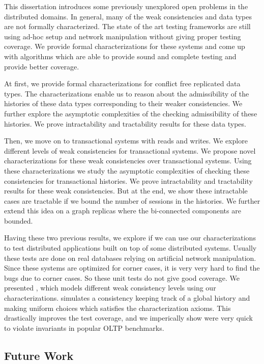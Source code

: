 
This dissertation introduces some previously unexplored open problems in the distributed domains. In general, many of the weak consistencies and data types are not formally characterized. The state of the art testing frameworks are still using ad-hoc setup and network manipulation without giving proper testing coverage. We provide formal characterizations for these systems and come up with algorithms which are able to provide sound and complete testing and provide better coverage.

At first, we provide formal characterizations for conflict free replicated data types. The characterizations enable us to reason about the admissibility of the histories of these data types corresponding to their weaker consistencies. We further explore the asymptotic complexities of the checking admissibility of these histories. We prove intractability and tractability results for these data types.

Then, we move on to transactional systems with reads and writes. We explore different levels of weak consistencies for transactional systems. We propose novel characterizations for these weak consistencies over transactional systems. Using these characterizations we study the asymptotic complexities of checking these consistencies for transactional histories. We prove intractability and tractability results for these weak consistencies. But at the end, we show these intractable cases are tractable if we bound the number of sessions in the histories. We further extend this idea on a graph replicas where the bi-connected components are bounded.

Having these two previous results, we explore if we can use our characterizations to test distributed applications built on top of some distributed systems. Usually these tests are done on real databases relying on artificial network manipulation. Since these systems are optimized for corner cases, it is very very hard to find the bugs due to corner cases. So these unit tests do not give good coverage. We presented \tool{}, which models different weak consistency levels using our characterizations. \tool{} simulates a consistency keeping track of a global history and making uniform choices which satisfies the characterization axioms. This drastically improves the test coverage, and we imperically show \tool{} were very quick to violate invariants in popular OLTP benchmarks.

\subsection{Future Work}

